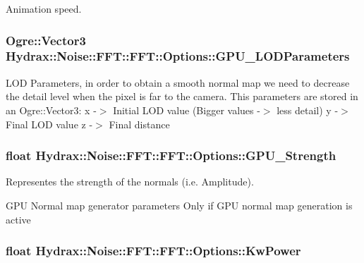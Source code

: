 Animation speed. 

\hypertarget{struct_hydrax_1_1_noise_1_1_f_f_t_1_1_options_407abbd0ee2f841a2856f18aa69d3f98}{
\subsubsection[{GPU\_\-LODParameters}]{\setlength{\rightskip}{0pt plus 5cm}Ogre::Vector3 Hydrax::Noise::FFT::FFT::Options::GPU\_\-LODParameters}}
\label{struct_hydrax_1_1_noise_1_1_f_f_t_1_1_options_407abbd0ee2f841a2856f18aa69d3f98}


LOD Parameters, in order to obtain a smooth normal map we need to decrease the detail level when the pixel is far to the camera. This parameters are stored in an Ogre::Vector3: x -$>$ Initial LOD value (Bigger values -$>$ less detail) y -$>$ Final LOD value z -$>$ Final distance \hypertarget{struct_hydrax_1_1_noise_1_1_f_f_t_1_1_options_93cca7338d3a4a201d068e4cd8afa330}{
\subsubsection[{GPU\_\-Strength}]{\setlength{\rightskip}{0pt plus 5cm}float Hydrax::Noise::FFT::FFT::Options::GPU\_\-Strength}}
\label{struct_hydrax_1_1_noise_1_1_f_f_t_1_1_options_93cca7338d3a4a201d068e4cd8afa330}


Representes the strength of the normals (i.e. Amplitude). 

GPU Normal map generator parameters Only if GPU normal map generation is active \hypertarget{struct_hydrax_1_1_noise_1_1_f_f_t_1_1_options_2e3cb6246534f5abdfb23d8d0ce6fa22}{
\subsubsection[{KwPower}]{\setlength{\rightskip}{0pt plus 5cm}float Hydrax::Noise::FFT::FFT::Options::KwPower}}
\label{struct_hydrax_1_1_noise_1_1_f_f_t_1_1_options_2e3cb6246534f5abdfb23d8d0ce6fa22}


